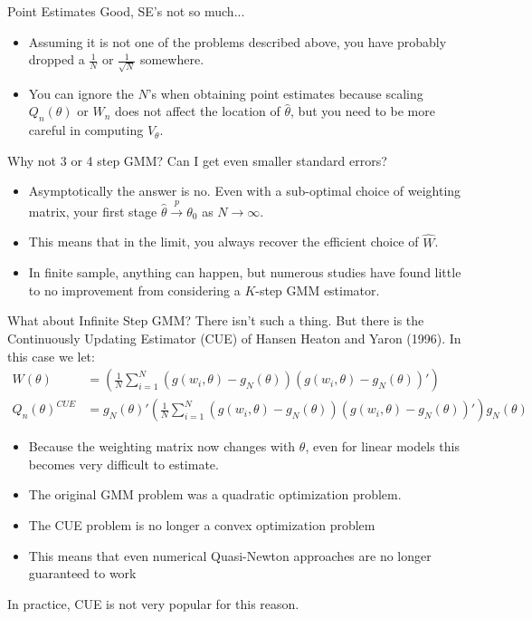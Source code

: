 \documentclass[aspectratio=169]{beamer}
\begin{document}
\begin{frame}{Point Estimates Good, SE's not so much...}
\begin{itemize}
\item Assuming it is not one of the problems described above, you have probably dropped a $\frac{1}{N}$ or $\frac{1}{\sqrt{N}}$ somewhere. 
\item You can ignore the $N$'s when obtaining point estimates because scaling $Q_n(\theta)$ or $W_n$ does not affect the location of $\hat{\theta}$, but you need to be more careful in computing $V_{\theta}$.
\end{itemize}
\end{frame}

\begin{frame}{Why not 3 or 4 step GMM?}
Can I get even smaller standard errors?
\begin{itemize}
\item Asymptotically the answer is no. Even with a sub-optimal choice of weighting matrix, your first stage  $\hat{\theta} \overset{p}{\to}\theta_0$ as $N \rightarrow \infty$.
\item This means that in the limit, you always recover the efficient choice of $\hat{W}$. 
\item In finite sample, anything can happen, but numerous studies have found little to no improvement from considering a $K$-step GMM estimator.
\end{itemize}
\end{frame}

\begin{frame}{What about Infinite Step GMM?}
There isn't such a thing. But there is the Continuously Updating Estimator (CUE) of Hansen Heaton and Yaron (1996). In this case we let:
\begin{align*}
W(\theta) &=\left(\frac{1}{N} \sum_{i=1}^N (g(w_i,\theta) - g_N(\theta)) (g(w_i,\theta)-g_N(\theta))' \right) \\
Q_n(\theta)^{CUE} &= g_N(\theta)' \left(\frac{1}{N} \sum_{i=1}^N (g(w_i,\theta) - g_N(\theta)) (g(w_i,\theta)-g_N(\theta))' \right) g_N(\theta)
\end{align*}
\begin{itemize}
\item Because the weighting matrix now changes with $\theta$, even for linear models this becomes very difficult to estimate. 
\item The original GMM problem was a quadratic optimization problem. 
\item The CUE problem is \alert{no longer a convex optimization problem}
\item This means that even numerical Quasi-Newton approaches are \alert{no longer guaranteed to work}
\end{itemize}
In practice, CUE is not very popular for this reason.
\end{frame}
\end{document}
